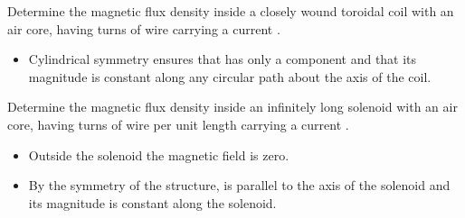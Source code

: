 \begin{ELexample}{}

Determine the magnetic flux density inside a closely wound toroidal coil with an air core, having  turns of wire carrying a current .


\begin{ELsolution}

\begin{itemize}
\tightlist
\item
  Cylindrical symmetry ensures that  has only a \ELim{\phi} component and that its magnitude is constant along any circular path about the axis of the coil.
\end{itemize}


\end{ELsolution}

\end{ELexample}


\begin{ELexample}{}

Determine the magnetic flux density inside an infinitely long solenoid with an air core, having  turns of wire per unit length carrying a current .


\begin{ELsolution}

\begin{itemize}
\tightlist
\item
  Outside the solenoid the magnetic field is zero.
\item
  By the symmetry of the structure,  is parallel to the axis of the solenoid and its magnitude is constant along the solenoid.
\end{itemize}


\end{ELsolution}

\end{ELexample}

\ELhold


